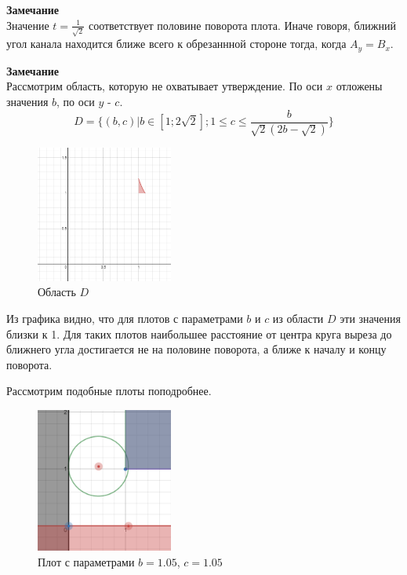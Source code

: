 \textbf{Замечание}\\
Значение $t=\frac{1}{\sqrt{2}}$ соответствует половине поворота плота. Иначе говоря, ближний угол канала находится ближе всего к обрезаннной стороне тогда, когда $A_y=B_x$.

\textbf{Замечание}\\
Рассмотрим область, которую не охватывает утверждение. По оси $x$ отложены значения $b$, по оси $y$ - $c$.
\begin{equation}
D=\{(b,c) | b \in [1;2\sqrt{2}]; 1 \leq c \leq \frac{b}{\sqrt{2}(2b-\sqrt{2})}\}
\end{equation}

\begin{figure}[!htb]
    \centering
    \includegraphics[width=0.4\textwidth]{fig/exception.png}
    \caption{Область $D$}
\end{figure}

Из графика видно, что для плотов с параметрами $b$ и $c$ из области $D$ эти значения близки к 1. Для таких плотов наибольшее расстояние от центра круга выреза до ближнего угла достигается не на половине поворота, а ближе к началу и концу поворота.\\

\newpage

Рассмотрим подобные плоты поподробнее. \\

\begin{figure}[!htb]
    \centering
    \includegraphics[width=0.4\textwidth]{fig/special.png}
    \caption{Плот с параметрами $b=1.05$, $c=1.05$}
\end{figure}

